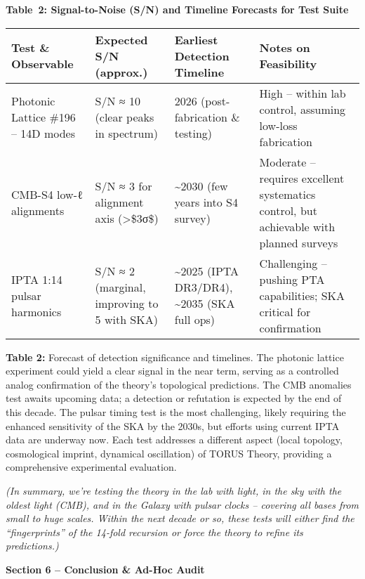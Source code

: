 \documentclass[]{article}
\begin{document}
\textbf{Table~2: Signal-to-Noise (S/N) and Timeline Forecasts for Test
Suite}

\begin{longtable}[]{@{}llll@{}}
\toprule
\textbf{Test \& Observable} & \textbf{Expected S/N (approx.)} &
\textbf{Earliest Detection Timeline} & \textbf{Notes on
Feasibility}\tabularnewline
\midrule
\endhead
Photonic Lattice \#196 -- 14D modes & S/N ≈ 10 (clear peaks in spectrum)
& 2026 (post-fabrication \& testing) & High -- within lab control,
assuming low-loss fabrication\tabularnewline
CMB-S4 low-ℓ alignments & S/N ≈ 3 for alignment axis
(\textgreater{}\$3σ\$)​ & \textasciitilde{}2030 (few years into S4
survey) & Moderate -- requires excellent systematics control, but
achievable with planned surveys\tabularnewline
IPTA 1:14 pulsar harmonics & S/N ≈ 2 (marginal, improving to 5 with
SKA)​ & \textasciitilde{}2025 (IPTA DR3/DR4), \textasciitilde{}2035 (SKA
full ops) & Challenging -- pushing PTA capabilities; SKA critical for
confirmation\tabularnewline
\bottomrule
\end{longtable}

\textbf{Table 2:} Forecast of detection significance and timelines. The
photonic lattice experiment could yield a clear signal in the near term,
serving as a controlled analog confirmation of the theory's topological
predictions​. The CMB anomalies test awaits upcoming data; a detection
or refutation is expected by the end of this decade. The pulsar timing
test is the most challenging, likely requiring the enhanced sensitivity
of the SKA by the 2030s, but efforts using current IPTA data are
underway now. Each test addresses a different aspect (local topology,
cosmological imprint, dynamical oscillation) of TORUS Theory, providing
a comprehensive experimental evaluation.

\emph{(In summary, we're testing the theory in the lab with light, in
the sky with the oldest light (CMB), and in the Galaxy with pulsar
clocks -- covering all bases from small to huge scales. Within the next
decade or so, these tests will either find the ``fingerprints'' of the
14-fold recursion or force the theory to refine its predictions.)}

\textbf{Section 6 -- Conclusion \& Ad-Hoc Audit}
\end{document}
